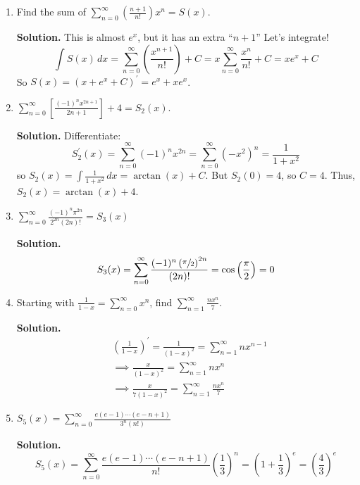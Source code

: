 \begin{Example}{}{}
    \begin{enumerate}[label=(\roman*)]
        \item Find the sum of $ \displaystyle \sum\limits_{n=0}^{\infty} \left( \frac{n+1}{n!} \right)x^n =S(x)$.

              \textbf{Solution.} This is almost $ e^x $, but it has an extra ``$ n+1 $'' Let's integrate!
              \[ \int S(x)\, d{x} =
                  \sum\limits_{n=0}^{\infty} \left( \frac{x^{n+1}}{n!}  \right) +C
                  =x \sum\limits_{n=0}^{\infty} \frac{x^n}{n!} +C
                  =x e^x+C \]
              So $ S(x)=(x+e^x+C)^\prime=e^x+xe^x $.

        \item $ \displaystyle \sum\limits_{n=0}^{\infty} \left[ \frac{(-1)^n x^{2n+1}}{2n+1} \right]+4
                  =S_2(x) $.

              \textbf{Solution.} Differentiate:
              \[ S_2^\prime(x)=\sum\limits_{n=0}^{\infty} (-1)^n x^{2n}=\sum\limits_{n=0}^{\infty} (-x^2)^n=
                  \frac{1}{1+x^2} \]
              so $ \displaystyle S_2(x)=\int \frac{1}{1+x^2} \, d{x} =\arctan(x)+C $. But $ S_2(0)=4 $,
              so $ C=4 $. Thus, $ S_2(x)=\arctan(x)+ 4 $.

        \item $ \displaystyle \sum\limits_{n=0}^{\infty} \frac{(-1)^n\pi^{2n}}{2^{2n}(2n)!}=S_3(x) $

              \textbf{Solution.}
              \[ S_3(x)=\sum\limits_{n=0}^{\infty} \frac{(-1)^n\left( \sfrac{\pi}{2} \right)^{2n}}{(2n)!}
                  =\cos\left( \frac{\pi}{2} \right)=0  \]

        \item Starting with $ \displaystyle \frac{1}{1-x} =\sum\limits_{n=0}^{\infty} x^n $,
              find $ \displaystyle\sum\limits_{n=1}^{\infty} \frac{n x^n}{7} $.

              \textbf{Solution.}
              \begin{align*}
                   & \left( \frac{1}{1-x} \right)^\prime=\frac{1}{(1-x)^2}=
                  \sum\limits_{n=1}^{\infty} n x^{n-1}                                      \\
                   & \implies \frac{x}{(1-x)^2}=\sum\limits_{n=1}^{\infty} n x^n            \\
                   & \implies \frac{x}{7(1-x)^2} =\sum\limits_{n=1}^{\infty} \frac{nx^n}{7}
              \end{align*}
        \item $ \displaystyle S_5(x)=\sum\limits_{n=0}^{\infty}
                  \frac{e(e-1)\cdots(e-n+1)}{3^n (n!)}  $

              \textbf{Solution.}
              \[ S_5(x)=\sum\limits_{n=0}^{\infty}
                  \frac{e(e-1)\cdots(e-n+1)}{n!}\left( \frac{1}{3}  \right)^n
                  =\left( 1+\frac{1}{3}  \right)^e
                  =\left( \frac{4}{3}  \right)^e \]

    \end{enumerate}
\end{Example}

